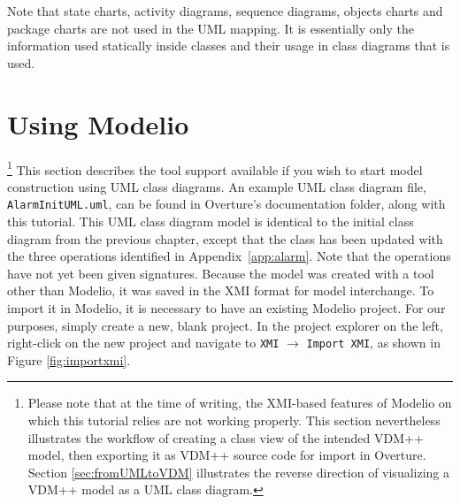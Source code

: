 
Note that state charts, activity diagrams, sequence diagrams, objects charts and package charts are not used in the UML mapping. It is essentially only the information used statically inside classes and their usage in class diagrams that is used.
%
\section{Using Modelio}\label{sec:Rose}
\footnote{Please note that at the time of writing, the XMI-based features of Modelio on which this tutorial relies are not working properly.  This section nevertheless illustrates the workflow of creating a class view of the intended VDM++ model, then exporting it as VDM++ source code for import in Overture.  Section \ref{sec:fromUMLtoVDM} illustrates the reverse direction of visualizing a VDM++ model as a UML class diagram.}
%
This section describes the tool support available if you wish to start model construction using UML class diagrams.  An example UML class diagram file, \texttt{AlarmInitUML.uml}, can be found in Overture's documentation folder, along with this tutorial.  This UML class diagram model is identical to the initial class diagram from the previous chapter, except that the  class has been updated with the three operations identified in Appendix~\ref{app:alarm}.
Note that the operations have not yet been given signatures.  Because the model was created with a tool other than Modelio, it was saved in the XMI format for model interchange.  To import it in Modelio, it is necessary to have an existing Modelio project.  For our purposes, simply create a new, blank project.  In the project explorer on the left, right-click on the new project and navigate to \texttt{XMI} $\rightarrow$ \texttt{Import XMI}, as shown in Figure \ref{fig:importxmi}.
%
